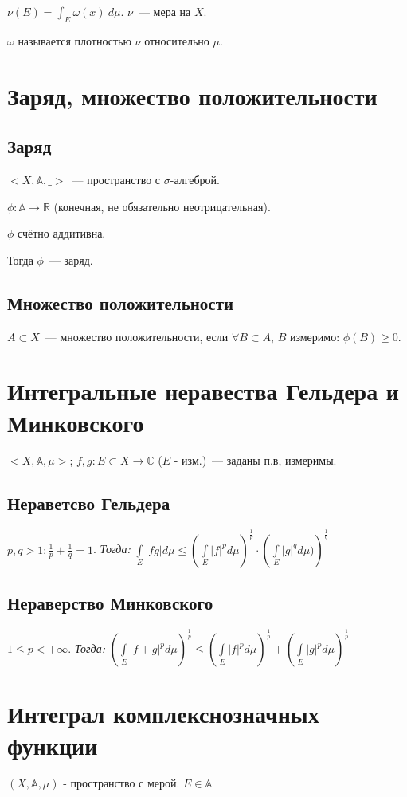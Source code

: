 \documentclass[paper=a4, fontsize=14pt]{report}
\begin{document}
$\nu(E) = \int_E \omega(x)~d\mu$. $\nu$~--- мера на $X$.

$\omega$ называется плотностью $\nu$ относительно $\mu$.

\section{Заряд, множество положительности}
\subsection{Заряд}
$<X, \mathds{A}, \_>$~--- пространство с $\sigma$-алгеброй.

$\phi: \mathds{A} \to \mathds{R}$ (конечная, не обязательно неотрицательная).

$\phi$ счётно аддитивна.

Тогда $\phi$~--- заряд.

\subsection{Множество положительности}
$A \subset X$~--- множество положительности, если
$\forall B \subset A$, $B$ измеримо: $\phi(B) \geq 0$.

\section{Интегральные неравества Гельдера и Минковского}
$<X, \mathds{A}, \mu>$; $f, g : E \subset X \rightarrow \mathds{C}$ ($E$ - изм.)~--- заданы п.в, измеримы.\\
\subsection{Нераветсво Гельдера}
$p, q > 1 : \frac{1}{p} + \frac{1}{q} = 1$.
\emph{Тогда:}
${\displaystyle \int\limits_E |fg|d\mu \leq \left(\int\limits_E |f|^p d\mu\right)^\frac{1}{p} \cdot \left(\int\limits_E |g|^q d\mu)\right)^\frac{1}{q}}$
\subsection{Нераверство Минковского}
$1 \leq p < +\infty$.
\emph{Тогда:}
${\displaystyle \left(\int\limits_E |f + g|^p d\mu \right)^\frac{1}{p}
    \leq \left(\int\limits_E |f|^p d\mu\right)^\frac{1}{p}
    + \left(\int\limits_E |g|^p d\mu\right)^\frac{1}{p}}$

\section{Интеграл комплекснозначных функции}
$(X, \mathds{A}, \mu)$ - пространство с мерой. $E \in \mathds{A}$
\end{document}
